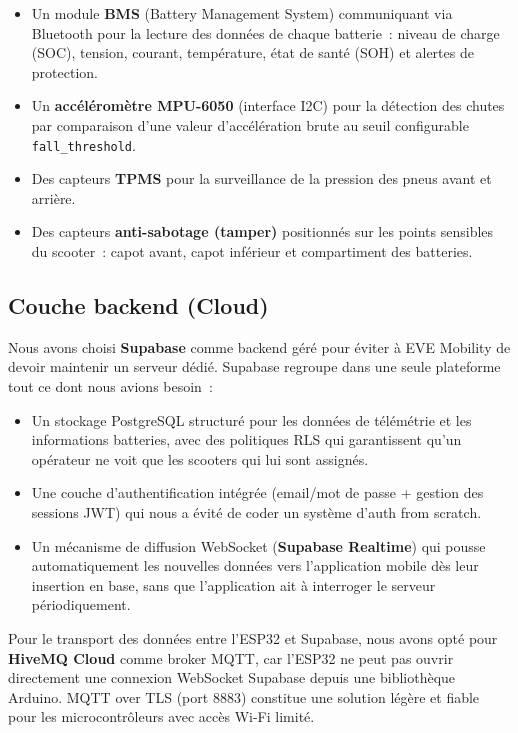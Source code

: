 \documentclass[12pt, a4paper]{report}
\begin{document}
\begin{itemize}
  \item Un module \textbf{BMS} (Battery Management System) communiquant via Bluetooth
        pour la lecture des données de chaque batterie~: niveau de charge (SOC),
        tension, courant, température, état de santé (SOH) et alertes de protection.
  \item Un \textbf{accéléromètre MPU-6050} (interface I2C) pour la détection des
        chutes par comparaison d'une valeur d'accélération brute au seuil configurable
        \texttt{fall\_threshold}.
  \item Des capteurs \textbf{TPMS} pour la surveillance de la pression des pneus
        avant et arrière.
  \item Des capteurs \textbf{anti-sabotage (tamper)} positionnés sur les points
        sensibles du scooter~: capot avant, capot inférieur et compartiment
        des batteries.
\end{itemize}

\subsection{Couche backend (Cloud)}

Nous avons choisi \textbf{Supabase} comme backend géré pour éviter à EVE Mobility
de devoir maintenir un serveur dédié. Supabase regroupe dans une seule plateforme
tout ce dont nous avions besoin~:

\begin{itemize}
  \item Un stockage PostgreSQL structuré pour les données de télémétrie et les
        informations batteries, avec des politiques RLS qui garantissent
        qu'un opérateur ne voit que les scooters qui lui sont assignés.
  \item Une couche d'authentification intégrée (email/mot de passe + gestion des
        sessions JWT) qui nous a évité de coder un système d'auth from scratch.
  \item Un mécanisme de diffusion WebSocket (\textbf{Supabase Realtime}) qui pousse
        automatiquement les nouvelles données vers l'application mobile dès leur
        insertion en base, sans que l'application ait à interroger le serveur
        périodiquement.
\end{itemize}

Pour le transport des données entre l'ESP32 et Supabase, nous avons opté pour
\textbf{HiveMQ Cloud} comme broker MQTT, car l'ESP32 ne peut pas ouvrir directement
une connexion WebSocket Supabase depuis une bibliothèque Arduino. MQTT over TLS (port
8883) constitue une solution légère et fiable pour les microcontrôleurs avec accès
Wi-Fi limité.
\end{document}
